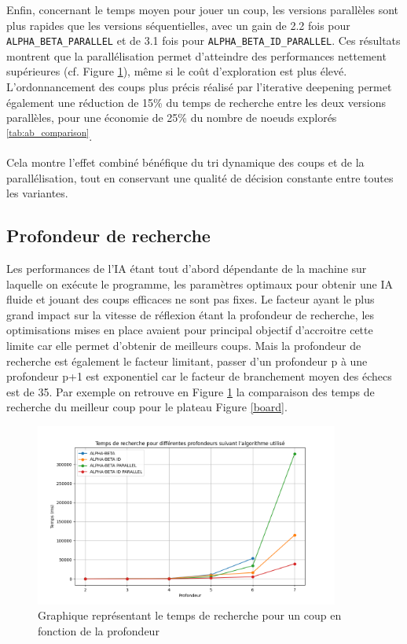 \documentclass{article}
\begin{document}
Enfin, concernant le temps moyen pour jouer un coup, les versions parallèles sont plus rapides que les versions séquentielles, avec un gain de 2.2 fois pour \texttt{ALPHA\_BETA\_PARALLEL} et de 3.1 fois pour \texttt{ALPHA\_BETA\_ID\_PARALLEL}. Ces résultats montrent que la parallélisation permet d'atteindre des performances nettement supérieures (cf. Figure \ref{plot}), même si le coût d'exploration est plus élevé.
L'ordonnancement des coups plus précis réalisé par l'iterative deepening permet également une réduction de 15\% du temps de recherche entre les deux versions parallèles, pour une économie de 25\% du nombre de noeuds explorés \textsuperscript{\ref{tab:ab_comparison}}.

Cela montre l'effet combiné bénéfique du tri dynamique des coups et de la parallélisation, tout en conservant une qualité de décision constante entre toutes les variantes.


\subsection{Profondeur de recherche}

Les performances de l'IA étant tout d'abord dépendante de la machine sur laquelle on exécute le programme, les paramètres optimaux pour obtenir une IA fluide et jouant des coups efficaces 
ne sont pas fixes. Le facteur ayant le plus grand impact sur la vitesse de réflexion étant la profondeur de recherche, les optimisations mises en place avaient pour principal objectif d'accroitre
cette limite car elle permet d'obtenir de meilleurs coups. Mais la profondeur de recherche est également le facteur limitant, passer d'un profondeur p à une profondeur p+1 est exponentiel car le facteur
de branchement moyen des échecs est de 35. Par exemple on retrouve en Figure \ref{plot} la comparaison des temps de recherche du meilleur coup pour le plateau Figure \ref{board}.

\begin{figure}[h]
    \centering
    \includegraphics[width=\textwidth,height=6.0cm,keepaspectratio]{plot_depth.png}
    \caption{Graphique représentant le temps de recherche pour un coup en fonction de la profondeur}
    \label{plot}
\end{figure}
\end{document}
